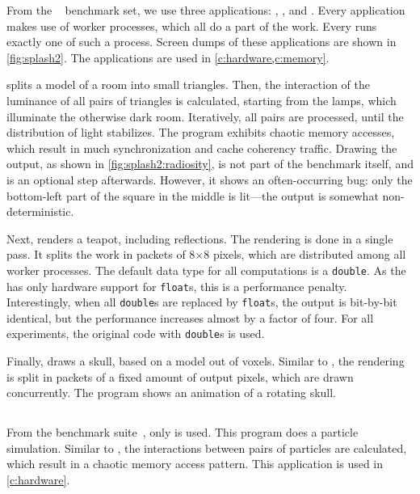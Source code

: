 From the \SPLASH*~\cite{woo:splash2} benchmark set, we use three applications: , , and .
Every application makes use of worker processes, which all do a part of the work.
Every \MicroBlaze runs exactly one of such a process.
Screen dumps of these applications are shown in \vref{fig:splash2}.
The applications are used in \cref{c:hardware,c:memory}.

 splits a  model of a room into small triangles.
Then, the interaction of the luminance of all pairs of triangles is calculated, starting from the lamps, which illuminate the otherwise dark room.
Iteratively, all pairs are processed, until the distribution of light stabilizes.
The program exhibits chaotic memory accesses, which result in much synchronization and cache coherency traffic.
Drawing the output, as shown in \vref{fig:splash2:radiosity}, is not part of the benchmark itself, and is an optional step afterwards.
However, it shows an often-occurring bug: only the bottom-left part of the square in the middle is lit---the output is somewhat non-deterministic.

Next,  renders a teapot, including reflections.
The rendering is done in a single pass.
It splits the work in packets of 8$\times$8 pixels, which are distributed among all worker processes.
The default data type for all computations is a \lstinline|double|.
As the \MicroBlaze has only hardware support for \lstinline|float|s, this is a performance penalty.
Interestingly, when all \lstinline|double|s are replaced by \lstinline|float|s, the output is bit-by-bit identical, but the performance increases almost by a factor of four.
For all experiments, the original code with \lstinline|double|s is used.

Finally,  draws a skull, based on a  model out of voxels.
Similar to , the rendering is split in packets of a fixed amount of output pixels, which are drawn concurrently.
The program shows an animation of a rotating skull.

\subsection{\PARSEC}
\label{s:parsec}

From the \PARSEC* benchmark suite~\cite{bienia:benchmark_multiprocs}, only  is used.
This program does a particle simulation.
Similar to , the interactions between pairs of particles are calculated, which result in a chaotic memory access pattern.
This application is used in \cref{c:hardware}.

